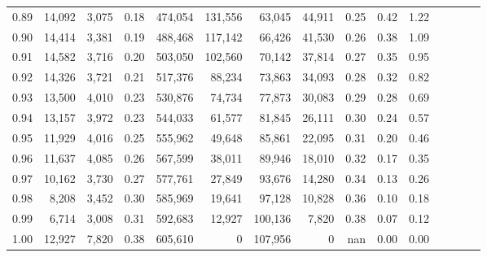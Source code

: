 \begin{tabular}{rrrcrrrrrrrrrrr}
0.89 &  14,092 &  3,075 &                                       0.18 &  474,054 &  131,556 &   63,045 &   44,911 &  0.25 &  0.42 &                         1.22 \\
0.90 &  14,414 &  3,381 &                                       0.19 &  488,468 &  117,142 &   66,426 &   41,530 &  0.26 &  0.38 &                         1.09 \\
0.91 &  14,582 &  3,716 &                                       0.20 &  503,050 &  102,560 &   70,142 &   37,814 &  0.27 &  0.35 &                         0.95 \\
0.92 &  14,326 &  3,721 &                                       0.21 &  517,376 &   88,234 &   73,863 &   34,093 &  0.28 &  0.32 &                         0.82 \\
0.93 &  13,500 &  4,010 &                                       0.23 &  530,876 &   74,734 &   77,873 &   30,083 &  0.29 &  0.28 &                         0.69 \\
0.94 &  13,157 &  3,972 &                                       0.23 &  544,033 &   61,577 &   81,845 &   26,111 &  0.30 &  0.24 &                         0.57 \\
0.95 &  11,929 &  4,016 &                                       0.25 &  555,962 &   49,648 &   85,861 &   22,095 &  0.31 &  0.20 &                         0.46 \\
0.96 &  11,637 &  4,085 &                                       0.26 &  567,599 &   38,011 &   89,946 &   18,010 &  0.32 &  0.17 &                         0.35 \\
0.97 &  10,162 &  3,730 &                                       0.27 &  577,761 &   27,849 &   93,676 &   14,280 &  0.34 &  0.13 &                         0.26 \\
0.98 &   8,208 &  3,452 &                                       0.30 &  585,969 &   19,641 &   97,128 &   10,828 &  0.36 &  0.10 &                         0.18 \\
0.99 &   6,714 &  3,008 &                                       0.31 &  592,683 &   12,927 &  100,136 &    7,820 &  0.38 &  0.07 &                         0.12 \\
1.00 &  12,927 &  7,820 &                                       0.38 &  605,610 &        0 &  107,956 &        0 &   nan &  0.00 &                         0.00 \\
\bottomrule
\end{tabular}
